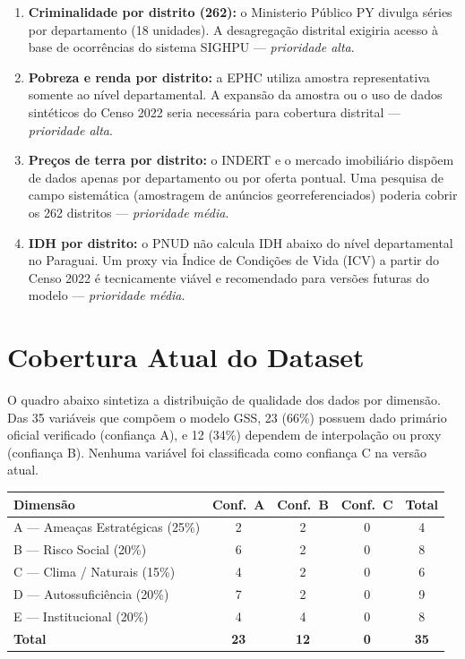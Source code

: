 \begin{enumerate}[nosep, leftmargin=1.8em]
  \item \textbf{Criminalidade por distrito (262):} o Ministerio Público PY
        divulga séries por departamento (18 unidades). A desagregação
        distrital exigiria acesso à base de ocorrências do sistema SIGHPU
        — \emph{prioridade alta}.
  \item \textbf{Pobreza e renda por distrito:} a EPHC utiliza amostra
        representativa somente ao nível departamental. A expansão da
        amostra ou o uso de dados sintéticos do Censo 2022 seria necessária
        para cobertura distrital — \emph{prioridade alta}.
  \item \textbf{Preços de terra por distrito:} o INDERT e o mercado
        imobiliário dispõem de dados apenas por departamento ou por oferta
        pontual. Uma pesquisa de campo sistemática (amostragem de anúncios
        georreferenciados) poderia cobrir os 262 distritos —
        \emph{prioridade média}.
  \item \textbf{IDH por distrito:} o PNUD não calcula IDH abaixo do nível
        departamental no Paraguai. Um proxy via Índice de Condições de Vida
        (ICV) a partir do Censo 2022 é tecnicamente viável e recomendado
        para versões futuras do modelo — \emph{prioridade média}.
\end{enumerate}

\section*{Cobertura Atual do Dataset}
\label{apendice:variaveis:cobertura}

O quadro abaixo sintetiza a distribuição de qualidade dos dados por
dimensão. Das 35 variáveis que compõem o modelo GSS, 23 (66\%) possuem
dado primário oficial verificado (confiança A), e 12 (34\%) dependem de
interpolação ou proxy (confiança B). Nenhuma variável foi classificada
como confiança C na versão atual.

\medskip
{\small
\renewcommand{\arraystretch}{1.3}
\begin{tabular}{@{}l c c c c@{}}
\toprule
\textbf{Dimensão} & \textbf{Conf.\ A} & \textbf{Conf.\ B} & \textbf{Conf.\ C} & \textbf{Total} \\
\midrule
A — Ameaças Estratégicas (25\%) & 2 & 2 & 0 & 4 \\
B — Risco Social (20\%)         & 6 & 2 & 0 & 8 \\
C — Clima / Naturais (15\%)     & 4 & 2 & 0 & 6 \\
D — Autossuficiência (20\%)     & 7 & 2 & 0 & 9 \\
E — Institucional (20\%)        & 4 & 4 & 0 & 8 \\
\midrule
\textbf{Total}                  & \textbf{23} & \textbf{12} & \textbf{0} & \textbf{35} \\
\bottomrule
\end{tabular}
}

